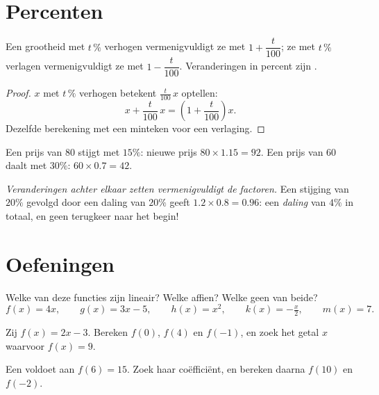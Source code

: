 \section{Percenten}

\begin{proposition}\label{prop:g9:linfunc:percent}
Een grootheid met $t\,\%$ verhogen vermenigvuldigt ze met
$1 + \dfrac{t}{100}$; ze met $t\,\%$ verlagen vermenigvuldigt ze met
$1 - \dfrac{t}{100}$. Veranderingen in percent zijn .
\end{proposition}

\begin{proof}
$x$ met $t\,\%$ verhogen betekent $\frac{t}{100}\,x$ optellen:
\[
x + \frac{t}{100}\,x = \left(1 + \frac{t}{100}\right) x .
\]
Dezelfde berekening met een minteken voor een verlaging.
\end{proof}

\begin{example}\label{ex:g9:linfunc:percent}
Een prijs van $80$ stijgt met $15\%$: nieuwe prijs $80 \times 1.15 = 92$. Een
prijs van $60$ daalt met $30\%$: $60 \times 0.7 = 42$.

\emph{Veranderingen achter elkaar zetten vermenigvuldigt de factoren.} Een
stijging van $20\%$ gevolgd door een daling van $20\%$ geeft
$1.2 \times 0.8 = 0.96$: een \emph{daling} van $4\%$ in totaal, en geen terugkeer
naar het begin!
\end{example}

\section{Oefeningen}

\begin{exercise}[$\star$]\label{exo:g9:linfunc:1}
Welke van deze functies zijn lineair? Welke affien? Welke geen van beide?
\[
f(x) = 4x, \qquad
g(x) = 3x - 5, \qquad
h(x) = x^2, \qquad
k(x) = -\tfrac x2, \qquad
m(x) = 7 .
\]
\end{exercise}

\begin{exercise}[$\star$]\label{exo:g9:linfunc:2}
Zij $f(x) = 2x - 3$. Bereken $f(0)$, $f(4)$ en $f(-1)$, en zoek het getal $x$
waarvoor $f(x) = 9$.
\end{exercise}

\begin{exercise}[$\star$]\label{exo:g9:linfunc:3}
Een  voldoet aan $f(6) = 15$. Zoek haar coëfficiënt, en bereken
daarna $f(10)$ en $f(-2)$.
\end{exercise}

